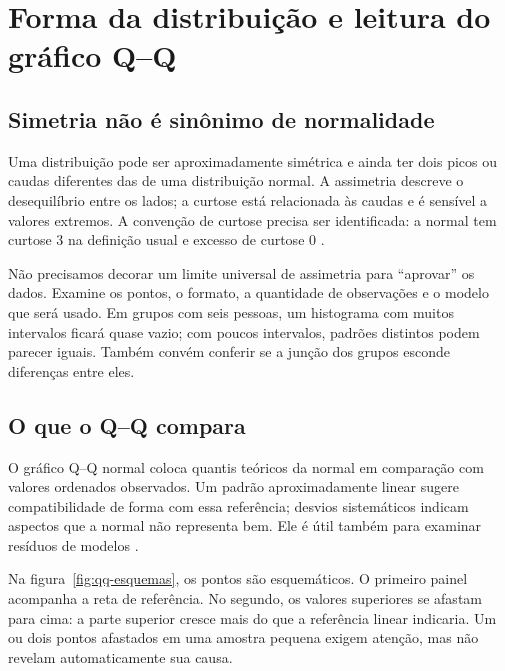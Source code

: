 \section{Forma da distribuição e leitura do gráfico Q--Q}
\label{sec:qq-descritivas}

\subsection{Simetria não é sinônimo de normalidade}

Uma distribuição pode ser aproximadamente simétrica e ainda ter dois picos ou caudas diferentes das de uma distribuição normal. A assimetria descreve o desequilíbrio entre os lados; a curtose está relacionada às caudas e é sensível a valores extremos. A convenção de curtose precisa ser identificada: a normal tem curtose 3 na definição usual e excesso de curtose 0 \parencite{NISTForma}.

Não precisamos decorar um limite universal de assimetria para ``aprovar'' os dados. Examine os pontos, o formato, a quantidade de observações e o modelo que será usado. Em grupos com seis pessoas, um histograma com muitos intervalos ficará quase vazio; com poucos intervalos, padrões distintos podem parecer iguais. Também convém conferir se a junção dos grupos esconde diferenças entre eles.

\subsection{O que o Q--Q compara}

O gráfico Q--Q normal coloca quantis teóricos da normal em comparação com valores ordenados observados. Um padrão aproximadamente linear sugere compatibilidade de forma com essa referência; desvios sistemáticos indicam aspectos que a normal não representa bem. Ele é útil também para examinar resíduos de modelos \parencite{NISTQQNormal}.

Na figura~\ref{fig:qq-esquemas}, os pontos são esquemáticos. O primeiro painel acompanha a reta de referência. No segundo, os valores superiores se afastam para cima: a parte superior cresce mais do que a referência linear indicaria. Um ou dois pontos afastados em uma amostra pequena exigem atenção, mas não revelam automaticamente sua causa.

